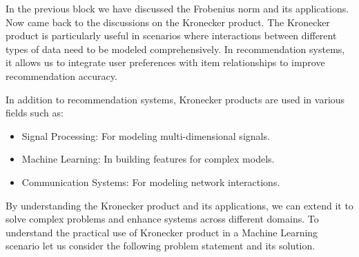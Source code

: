 \documentclass[
  letterpaper,
  DIV=11,
  numbers=noendperiod]{scrreprt}
\providecommand{\tightlist}{%
  \setlength{\itemsep}{0pt}\setlength{\parskip}{0pt}}\usepackage{longtable,booktabs,array}
\theoremstyle{plain}
\theoremstyle{definition}
\theoremstyle{remark}
\begin{document}
In the previous block we have discussed the Frobenius norm and its
applications. Now came back to the discussions on the Kronecker product.
The Kronecker product is particularly useful in scenarios where
interactions between different types of data need to be modeled
comprehensively. In recommendation systems, it allows us to integrate
user preferences with item relationships to improve recommendation
accuracy.

In addition to recommendation systems, Kronecker products are used in
various fields such as:

\begin{itemize}
\tightlist
\item
  Signal Processing: For modeling multi-dimensional signals.
\item
  Machine Learning: In building features for complex models.
\item
  Communication Systems: For modeling network interactions.
\end{itemize}

By understanding the Kronecker product and its applications, we can
extend it to solve complex problems and enhance systems across different
domains. To understand the practical use of Kronecker product in a
Machine Learning scenario let us consider the following problem
statement and its solution.
\end{document}
